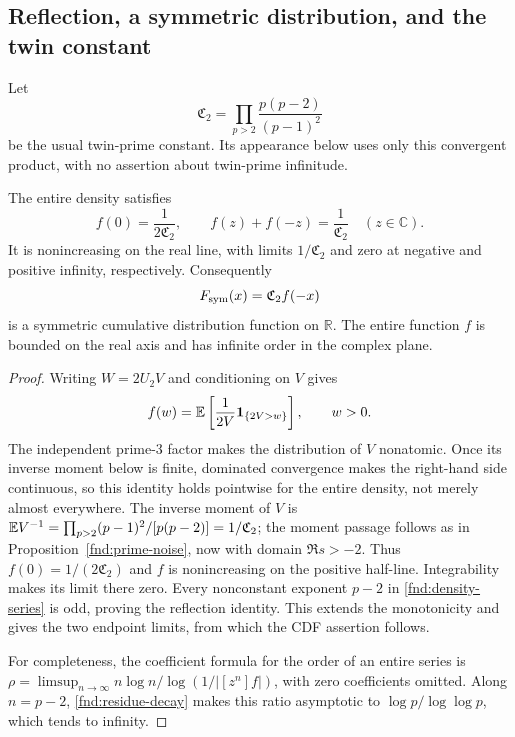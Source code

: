 \subsection{Reflection, a symmetric distribution, and the twin constant}

Let
\begin{equation}
 \mathfrak C_2=\prod_{p>2}\frac{p(p-2)}{(p-1)^2}
 \label{fnd:twin-constant}
\end{equation}
be the usual twin-prime constant.  Its appearance below uses only
this convergent product, with no assertion about twin-prime
infinitude.

\begin{corollary}\label{fnd:reflection}
The entire density satisfies
\begin{equation}
 f(0)=\frac1{2\mathfrak C_2},\qquad
 f(z)+f(-z)=\frac1{\mathfrak C_2}\quad(z\in\mathbb C).
 \label{fnd:reflection-identity}
\end{equation}
It is nonincreasing on the real line, with limits
$1/\mathfrak C_2$ and zero at negative and positive infinity,
respectively.  Consequently
\[
 F_{\mathrm{sym}}(x)=\mathfrak C_2 f(-x)
\]
is a symmetric cumulative distribution function on $\mathbb R$.
The entire function $f$ is bounded on the real axis and has
infinite order in the complex plane.
\end{corollary}
\begin{proof}
Writing $W=2U_2V$ and conditioning on $V$ gives
\begin{equation}
 f(w)=\mathbb E\left[\frac1{2V}\mathbf1_{\{2V>w\}}\right],
 \qquad w>0.
 \label{fnd:density-monotone}
\end{equation}
The independent prime-$3$ factor makes the distribution of $V$
nonatomic.  Once its inverse moment below is finite, dominated
convergence makes the right-hand side continuous, so this identity
holds pointwise for the entire density, not merely almost everywhere.
The inverse moment of $V$ is
$\mathbb E V^{-1}=\prod_{p>2}(p-1)^2/[p(p-2)]=1/\mathfrak C_2$;
the moment passage follows as in Proposition~\ref{fnd:prime-noise},
now with domain $\Re s>-2$.  Thus
$f(0)=1/(2\mathfrak C_2)$ and $f$ is nonincreasing on the
positive half-line.  Integrability makes its limit there zero.
Every nonconstant exponent $p-2$ in
\eqref{fnd:density-series} is odd, proving the reflection identity.
This extends the monotonicity and gives the two endpoint limits,
from which the CDF assertion follows.

For completeness, the coefficient formula for the order of an
entire series is
$\rho=\limsup_{n\to\infty}n\log n/\log(1/|[z^n]f|)$,
with zero coefficients omitted.  Along $n=p-2$,
\eqref{fnd:residue-decay} makes this ratio asymptotic to
$\log p/\log\log p$, which tends to infinity.
\end{proof}

